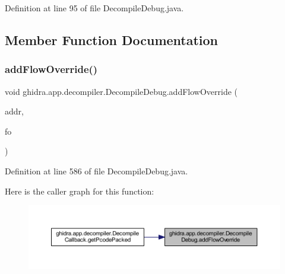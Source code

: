 Definition at line 95 of file Decompile\+Debug.\+java.



\subsection{Member Function Documentation}
\mbox{\label{classghidra_1_1app_1_1decompiler_1_1_decompile_debug_ab047b61fe9aa3497e61db0bfcab314f1}} 
\subsubsection{\texorpdfstring{addFlowOverride()}{addFlowOverride()}}
{\footnotesize\ttfamily void ghidra.\+app.\+decompiler.\+Decompile\+Debug.\+add\+Flow\+Override (\begin{DoxyParamCaption}\item[{\mbox{\hyperlink{class_address}{Address}}}]{addr,  }\item[{Flow\+Override}]{fo }\end{DoxyParamCaption})\hspace{0.3cm}{\ttfamily [inline]}}



Definition at line 586 of file Decompile\+Debug.\+java.

Here is the caller graph for this function\+:
\nopagebreak
\begin{figure}[H]
\begin{center}
\leavevmode
\includegraphics[width=350pt]{classghidra_1_1app_1_1decompiler_1_1_decompile_debug_ab047b61fe9aa3497e61db0bfcab314f1_icgraph}
\end{center}
\end{figure}
\mbox{\label{classghidra_1_1app_1_1decompiler_1_1_decompile_debug_a7163633c8aa4444a1fc36fff80482428}} 
